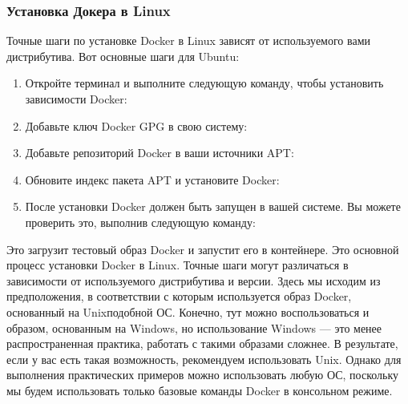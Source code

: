 \documentclass[letterpaper,10pt,russian]{sphinxmanual}
\begin{document}
\subsubsection{Установка Докера в Linux}
\label{\detokenize{educational_materials/docker_base/content:linux}}
\sphinxAtStartPar
Точные шаги по установке Docker в Linux зависят от используемого вами дистрибутива. Вот
основные шаги для Ubuntu:
\begin{enumerate}
%
\item {} 
\sphinxAtStartPar
Откройте терминал и выполните следующую команду, чтобы установить зависимости Docker:

\item {} 
\sphinxAtStartPar
Добавьте ключ Docker GPG в свою систему:

\item {} 
\sphinxAtStartPar
Добавьте репозиторий Docker в ваши источники APT:

\item {} 
\sphinxAtStartPar
Обновите индекс пакета APT и установите Docker:

\item {} 
\sphinxAtStartPar
После установки Docker должен быть запущен в вашей системе. Вы можете проверить это, выполнив следующую команду:

\end{enumerate}

\sphinxAtStartPar
Это загрузит тестовый образ Docker и запустит его в контейнере. Это основной процесс установки Docker в Linux. Точные шаги могут различаться в зависимости от используемого дистрибутива и версии. Здесь мы исходим из предположения, в соответствии с которым используется образ Docker, основанный на Unix\sphinxhyphen{}подобной ОС. Конечно, тут можно воспользоваться и образом, основанным на Windows, но использование Windows — это менее распространенная практика, работать с такими образами сложнее. В результате, если у вас есть такая возможность, рекомендуем использовать Unix. Однако для выполнения практических примеров можно использовать любую ОС, поскольку мы будем использовать только базовые команды Docker в консольном режиме.
\end{document}
